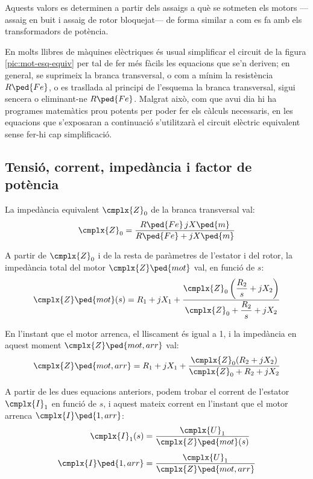 Aquests valors es determinen a partir dels assaigs a què se sotmeten els motors ---assaig en buit i assaig de rotor bloquejat--- de forma similar a com es fa amb els transformadors de potència.

En molts llibres de màquines elèctriques és usual simplificar el circuit de la figura  \vref{pic:mot-esq-equiv} per tal de fer més fàcils les equacions que se'n deriven; en general, se suprimeix la branca transversal, o com a mínim la resistència $R\ped{Fe}$, o es trasllada al principi de l'esquema la branca transversal, sigui sencera o eliminant-ne  $R\ped{Fe}$. Malgrat això, com que avui dia hi ha programes matemàtics prou potents per poder fer els càlculs necessaris, en les equacions que s'exposaran a continuació s'utilitzarà el circuit elèctric equivalent sense fer-hi cap simplificació.

\subsection{Tensió, corrent, impedància i factor de potència}\label{sec:mot-u-c-i}

La impedància equivalent $\cmplx{Z}_0$ de la branca transversal val:
\begin{equation}\label{eq:mot-Z0}
    \cmplx{Z}_0 = \frac{R\ped{Fe} \, j X\ped{m}}{ R\ped{Fe} + j X\ped{m}}
\end{equation}

A partir de $\cmplx{Z}_0$ i de la resta de paràmetres de l'estator i del rotor, la impedància total del motor $\cmplx{Z}\ped{mot}$ val,  en funció de $s$:
\begin{equation}\label{eq:mot-Zmot}\index{motors d'inducció!impedància}
    \cmplx{Z}\ped{mot}(s) = R_1 + j X_1 + \frac{\cmplx{Z}_0 \left( \dfrac{R_2}{s} + j X_2\right)}{\cmplx{Z}_0 +  \dfrac{R_2}{s} + j X_2}
\end{equation}

En l'instant que el motor arrenca, el lliscament és igual a 1, i la impedància en aquest moment $\cmplx{Z}\ped{mot,arr}$ val:
\begin{equation}\label{eq:z-mot-arr}
    \cmplx{Z}\ped{mot,arr} = R_1 + j X_1 + \frac{\cmplx{Z}_0 ( R_2 + j X_2)}{\cmplx{Z}_0 +  R_2 + j X_2}
\end{equation}

A partir de les dues equacions anteriors, podem trobar el corrent de l'estator  $\cmplx{I}_1$ en funció de $s$, i aquest mateix corrent en l'instant que el motor arrenca $\cmplx{I}\ped{1,arr}$:
\begin{subequations}\index{motors d'inducció!corrent d'arrencada}\index{motors d'inducció!corrent}
\begin{align}
    \cmplx{I}_1(s) &= \frac{\cmplx{U}_1}{\cmplx{Z}\ped{mot}(s)}\label{eq:I1-mot} \\[1ex]
    \cmplx{I}\ped{1,arr} &= \frac{\cmplx{U}_1}{\cmplx{Z}\ped{mot,arr}}\label{eq:I1-mot-arr}
\end{align}
\end{subequations}

